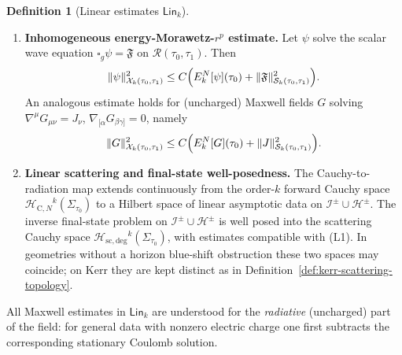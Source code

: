 \documentclass[11pt]{article}
\numberwithin{equation}{section}
\theoremstyle{plain}
\theoremstyle{definition}
\newtheorem{definition}{Definition}[section]
\theoremstyle{remark}
\newcommand{\Lin}{\mathsf{Lin}}
\newcommand{\Hcauchy}{\mathcal H_{\mathrm{C},N}}
\newcommand{\Hscatt}{\mathcal H_{\mathrm{sc,deg}}}
\begin{document}
\begin{definition}[Linear estimates $\Lin_{k}$]
\begin{enumerate}
\item[(L1)] \textbf{Inhomogeneous energy-Morawetz-$r^{p}$ estimate.}
Let $\psi$ solve the scalar wave equation $\square_{g}\psi=\mathfrak{F}$ on $\mathcal{R}(\tau_{0},\tau_{1})$.
Then
\begin{equation}\label{eq:Lin-abstract}
\|\psi\|_{\mathcal X_{k}(\tau_{0},\tau_{1})}^{2}
\le
C\Bigl(E^{N}_{k}[\psi](\tau_{0})
+\|\mathfrak{F}\|_{\mathcal S_{k}(\tau_{0},\tau_{1})}^{2}\Bigr).
\end{equation}
An analogous estimate holds for (uncharged) Maxwell fields $G$ solving
$\nabla^{\mu}G_{\mu\nu}=J_{\nu}$, $\nabla_{[\alpha}G_{\beta\gamma]}=0$, namely
\begin{equation}
\|G\|_{\mathcal X_{k}(\tau_{0},\tau_{1})}^{2}
\le
C\Bigl(E^{N}_{k}[G](\tau_{0})
+\|J\|_{\mathcal S_{k}(\tau_{0},\tau_{1})}^{2}\Bigr).
\end{equation}

\item[(L2)] \textbf{Linear scattering and final-state well-posedness.}
The Cauchy-to-radiation map extends continuously from the order-$k$ forward Cauchy space ${\Hcauchy}^{k}(\Sigma_{\tau_0})$ to a Hilbert space of linear asymptotic data on $\mathcal I^{\pm}\cup\mathcal H^{\pm}$. The inverse final-state problem on $\mathcal I^{\pm}\cup\mathcal H^{\pm}$ is well posed into the scattering Cauchy space ${\Hscatt}^{k}(\Sigma_{\tau_0})$, with estimates compatible with (L1). In geometries without a horizon blue-shift obstruction these two spaces may coincide; on Kerr they are kept distinct as in Definition~\ref{def:kerr-scattering-topology}.
\end{enumerate}

All Maxwell estimates in $\Lin_{k}$ are understood for the \emph{radiative} (uncharged) part of the field:
for general data with nonzero electric charge one first subtracts the corresponding stationary Coulomb solution.
\end{definition}
\end{document}

